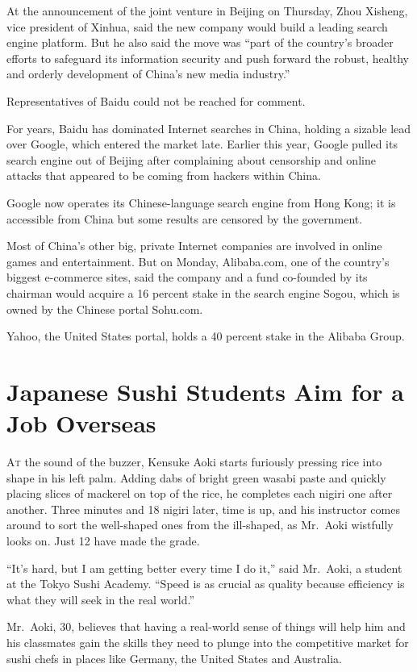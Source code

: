 ﻿\documentclass[12pt]{article}
\begin{document}
At the announcement of the joint venture in Beijing on Thursday, Zhou Xisheng, vice president of
Xinhua, said the new company would build a leading search engine platform. But he also said the move
was ``part of the country's broader efforts to safeguard its information security and push forward
the robust, healthy and orderly development of China's new media industry.''

Representatives of Baidu could not be reached for comment.

For years, Baidu has dominated Internet searches in China, holding a sizable lead over Google, which
entered the market late. Earlier this year, Google pulled its search engine out of Beijing after
complaining about censorship and online attacks that appeared to be coming from hackers within
China.

Google now operates its Chinese-language search engine from Hong Kong; it is accessible from China
but some results are censored by the government.

Most of China's other big, private Internet companies are involved in online games and
entertainment. But on Monday, Alibaba.com, one of the country's biggest e-commerce sites, said the
company and a fund co-founded by its chairman would acquire a 16 percent stake in the search engine
Sogou, which is owned by the Chinese portal Sohu.com.

Yahoo, the United States portal, holds a 40 percent stake in the Alibaba Group.

\section{Japanese Sushi Students Aim for a Job Overseas}

\lettrine{A}{t} the sound of the buzzer, Kensuke Aoki starts furiously
pressing rice into shape in his left palm. Adding dabs of bright green wasabi paste and quickly
placing slices of mackerel on top of the rice, he completes each nigiri one after another. Three
minutes and 18 nigiri later, time is up, and his instructor comes around to sort the well-shaped
ones from the ill-shaped, as Mr.~Aoki wistfully looks on. Just 12 have made the grade.

``It's hard, but I am getting better every time I do it,'' said Mr.~Aoki, a student at the Tokyo
Sushi Academy. ``Speed is as crucial as quality because efficiency is what they will seek in the
real world.''

Mr.~Aoki, 30, believes that having a real-world sense of things will help him and his classmates
gain the skills they need to plunge into the competitive market for sushi chefs in places like
Germany, the United States and Australia.
\end{document}
